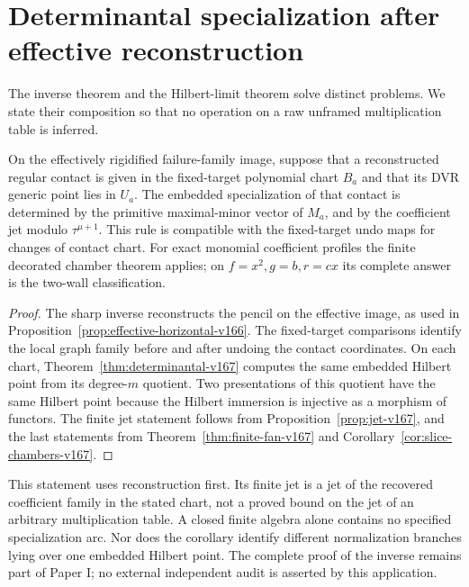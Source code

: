 \section{Determinantal specialization after effective reconstruction}
\label{sec:effective-states-v167}
The inverse theorem and the Hilbert-limit theorem solve distinct
problems. We state their composition so that no operation on a
raw unframed multiplication table is inferred.

\begin{corollary}
\label{cor:effective-states-v167}
On the effectively rigidified failure-family image, suppose that
a reconstructed regular contact is given in the fixed-target
polynomial chart $B_a$ and that its DVR generic point lies in
$U_a$. The embedded specialization of that contact is determined
by the primitive maximal-minor vector of $M_a$, and by the
coefficient jet modulo $\tau^{\mu+1}$. This rule is compatible
with the fixed-target undo maps for changes of contact chart.
For exact monomial coefficient profiles the finite decorated
chamber theorem applies; on $f=x^2,g=b,r=cx$ its complete answer
is the two-wall classification.
\end{corollary}
\begin{proof}
The sharp inverse reconstructs the pencil on the effective image,
as used in Proposition~\ref{prop:effective-horizontal-v166}.
The fixed-target comparisons identify the local graph family
before and after undoing the contact coordinates. On each chart,
Theorem~\ref{thm:determinantal-v167} computes the same embedded
Hilbert point from its degree-$m$ quotient. Two presentations
of this quotient have the same Hilbert point because the Hilbert
immersion is injective as a morphism of functors. The finite jet
statement follows from Proposition~\ref{prop:jet-v167}, and the
last statements from Theorem~\ref{thm:finite-fan-v167} and
Corollary~\ref{cor:slice-chambers-v167}.
\end{proof}
This statement uses reconstruction first. Its finite jet is a jet
of the recovered coefficient family in the stated chart, not a
proved bound on the jet of an arbitrary multiplication table.
A closed finite algebra alone contains no specified specialization
arc. Nor does the corollary identify different normalization
branches lying over one embedded Hilbert point. The complete
proof of the inverse remains part of Paper I; no external
independent audit is asserted by this application.
